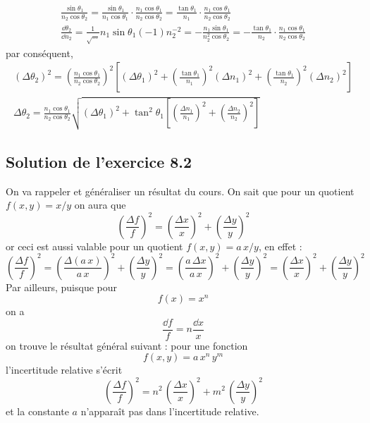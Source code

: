 \begin{description}
\begin{gather*}
\frac{\sin{\theta_1}}{n_2\cos{\theta_2}}=\frac{\sin{\theta_1}}{n_1\cos{\theta_1}}\cdot\frac{n_1\cos{\theta_1}}{n_2\cos{\theta_2}}=
\frac{\tan{\theta_1}}{n_1}\cdot\frac{n_1\cos{\theta_1}}{n_2\cos{\theta_2}}\\
\frac{\dd\theta_2}{\dd n_2}=\frac{1}{\sqrt{\dots}}n_1\sin{\theta_1}(-1)n_2^{-2}=
-\frac{n_1\sin{\theta_1}}{n_2^2\cos{\theta_2}}=
-\frac{\tan{\theta_1}}{n_2}\cdot\frac{n_1\cos{\theta_1}}{n_2\cos{\theta_2}}
\end{gather*}
par conséquent,
\begin{gather*}
(\Delta\theta_2)^2=\left(\frac{n_1\cos{\theta_1}}{n_2\cos{\theta_2}}\right)^2
\left[(\Delta\theta_1)^2+
\left(\frac{\tan{\theta_1}}{n_1}\right)^2(\Delta n_1)^2+
\left(\frac{\tan{\theta_1}}{n_2}\right)^2(\Delta n_2)^2\right]\\
\Delta\theta_2=
\frac{n_1\cos{\theta_1}}{n_2\cos{\theta_2}}
\sqrt{(\Delta\theta_1)^2+\tan^2{\theta_1}
\left[\left(\frac{\Delta n_1}{n_1}\right)^2+\left(\frac{\Delta n_2}{n_2}\right)^2\right]}
\end{gather*}
\end{description}

\subsection*{Solution de l'exercice 8.2}

On va rappeler et généraliser un résultat du cours. On sait que pour un quotient $f(x,y)=x/y$ on aura que
$$
\left(\frac{\Delta f}{f}\right)^2=\left(\frac{\Delta x}{x}\right)^2+
\left(\frac{\Delta y}{y}\right)^2
$$
or ceci est aussi valable pour un quotient $f(x,y)=a\,x/y$, en effet :
$$
\left(\frac{\Delta f}{f}\right)^2=
\left(\frac{\Delta(a\,x)}{a\,x}\right)^2+\left(\frac{\Delta y}{y}\right)^2=
\left(\frac{a\,\Delta x}{a\,x}\right)^2+\left(\frac{\Delta y}{y}\right)^2=
\left(\frac{\Delta x}{x}\right)^2+\left(\frac{\Delta y}{y}\right)^2
$$
Par ailleurs, puisque pour
$$f(x)=x^n$$
on a
$$\frac{\dd f}{f}=n\frac{\dd x}{x}$$
on trouve le résultat général suivant : pour une fonction
$$f(x,y)=a\,x^n\,y^m$$
l'incertitude relative s'écrit
$$
\left(\frac{\Delta f}{f}\right)^2=
n^2\,\left(\frac{\Delta x}{x}\right)^2+m^2\,\left(\frac{\Delta y}{y}\right)^2
$$
et la constante $a$ n'apparaît pas dans l'incertitude relative.

